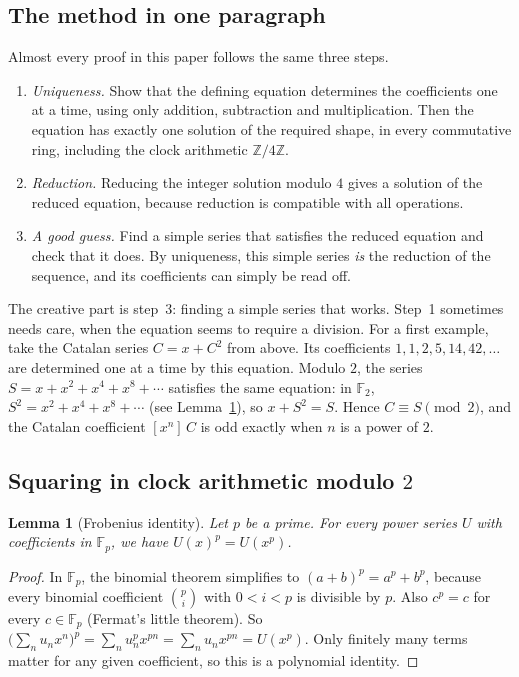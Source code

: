 \documentclass[11pt,a4paper]{article}
\newtheorem{lemma}[theorem]{Lemma}
\theoremstyle{definition}
\theoremstyle{remark}
\newcommand{\Z}{\mathbb{Z}}
\newcommand{\F}{\mathbb{F}}
\newcommand{\coeff}[2]{[x^{#1}]\,#2}
\begin{document}
\subsection{The method in one paragraph}
Almost every proof in this paper follows the same three steps.
\begin{enumerate}
\item \emph{Uniqueness.} Show that the defining equation determines the coefficients one at a time, using only
addition, subtraction and multiplication. Then the equation has exactly one solution of the required shape, in every
commutative ring, including the clock arithmetic $\Z/4\Z$.
\item \emph{Reduction.} Reducing the integer solution modulo $4$ gives a solution of the reduced equation,
because reduction is compatible with all operations.
\item \emph{A good guess.} Find a simple series that satisfies the reduced equation and check that it does. By uniqueness,
this simple series \emph{is} the reduction of the sequence, and its coefficients can simply be read off.
\end{enumerate}
The creative part is step~3: finding a simple series that works. Step~1 sometimes needs care, when the equation seems to
require a division.
For a first example, take the Catalan series $C=x+C^2$ from above. Its coefficients $1,1,2,5,14,42,\dots$ are
determined one at a time by this equation. Modulo $2$, the series $S=x+x^2+x^4+x^8+\cdots$ satisfies the same
equation: in $\F_2$, $S^2=x^2+x^4+x^8+\cdots$ (see Lemma~\ref{lem:frobenius}), so $x+S^2=S$. Hence $C\equiv S\pmod2$,
and the Catalan coefficient $\coeff{n}{C}$ is odd exactly when $n$ is a power of $2$.

\subsection{Squaring in clock arithmetic modulo \texorpdfstring{$2$}{2}}
\begin{lemma}[Frobenius identity]\label{lem:frobenius}
Let $p$ be a prime. For every power series $U$ with coefficients in $\F_p$, we have $U(x)^p=U(x^p)$.
\end{lemma}

\begin{proof}
In $\F_p$, the binomial theorem simplifies to $(a+b)^p=a^p+b^p$, because every binomial coefficient
$\binom pi$ with $0<i<p$ is divisible by $p$. Also $c^p=c$ for every $c\in\F_p$ (Fermat's little theorem). So
$\bigl(\sum_nu_nx^n\bigr)^p=\sum_nu_n^px^{pn}=\sum_nu_nx^{pn}=U(x^p)$. Only finitely many terms matter for any given
coefficient, so this is a polynomial identity.
\end{proof}
\end{document}
